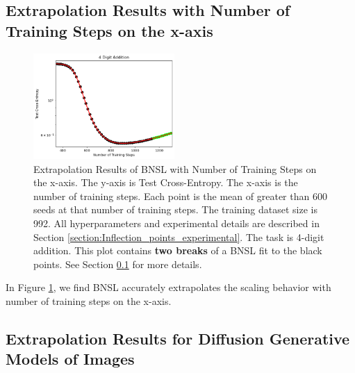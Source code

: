 \documentclass{article} %
\begin{document}
\FloatBarrier


\subsection{Extrapolation Results with Number of Training Steps on the x-axis}
\label{section:steps}

\vspace{-2.4mm}

\begin{figure}[htbp]
    \centering
\includegraphics[width=0.478\textwidth]{figures/num_steps/num_steps.png}

\vspace{-4.2mm}
    \caption{
Extrapolation Results of BNSL with Number of Training Steps on the x-axis. The y-axis is Test Cross-Entropy. The x-axis is the number of training steps. Each point is the mean of greater than 600 seeds at that number of training steps. The training dataset size is 992. All hyperparameters and experimental details are described in Section \ref{section:Inflection_points_experimental}. The task is 4-digit addition. This plot contains \textbf{two breaks} of a BNSL fit to the black points. See Section \ref{section:steps} for more details.
    }
    \label{fig:steps}
\end{figure}

\vspace{-1.0mm}

In Figure \ref{fig:steps}, we find BNSL accurately extrapolates the scaling behavior with number of training steps on the x-axis.


\clearpage

\clearpage


\iffalse

\subsection{Extrapolation Results for Diffusion Generative Models of Images}
\label{section:diffusion}
\end{document}
